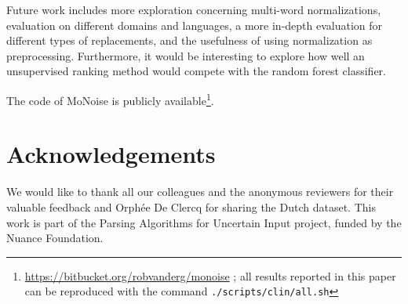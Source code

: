 \documentclass[a4paper,10pt,twoside]{article}
\begin{document}
Future work includes more exploration concerning multi-word normalizations,
evaluation on different domains and languages, a more in-depth evaluation for
different types of replacements, and the usefulness of using normalization as
preprocessing.  Furthermore, it would be interesting to explore how well an
unsupervised ranking method would compete with the random forest classifier. 

The code of MoNoise is publicly
available\footnote{\url{https://bitbucket.org/robvanderg/monoise} ; all results
reported in this paper can be reproduced with the command
\texttt{./scripts/clin/all.sh}}. 

 
\section*{Acknowledgements}
We would like to thank all our colleagues and the anonymous reviewers
for their valuable feedback and Orph{\'e}e De Clercq for sharing the Dutch dataset. 
This work is part of the Parsing Algorithms for Uncertain Input project, funded by
the Nuance Foundation.

 
 
  
\end{document}
